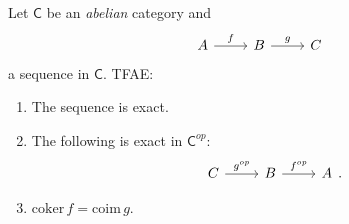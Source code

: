 \documentclass[../Main]{subfiles}
\begin{document}
\begin{lem}
	Let $\mathsf{C}$ be an {\em abelian} category and
	\begin{equation}
	\begin{tikzcd}
		A \arrow[r, "f", rightarrow] &
		B \arrow[r, "g", rightarrow] &
		C
	\end{tikzcd}
	\end{equation} 
	a sequence in $\mathsf{C}$.
	TFAE:
	\begin{enumerate}
		\item The sequence is exact.
		\item The following is exact in $\mathsf{C}^{op}$:
			\begin{equation}
			\begin{tikzcd}
				C \arrow[r, "g^{op}", rightarrow] &
				B \arrow[r, "f^{op}", rightarrow] &
				A
			\end{tikzcd}
			.\end{equation} 
		\item $\mathrm{coker}\, f = \mathrm{coim}\,  g$.
	\end{enumerate}
\end{lem} 
\end{document}
